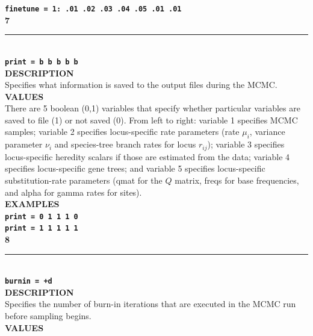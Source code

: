 \documentclass{book}
\numberwithin{equation}{section} \renewcommand{\baselinestretch}{0.55}
\begin{document}
\textbf{\texttt{finetune = 1: .01 .02 .03 .04 .05 .01 .01}}\vspace{10pt}\\
\textbf{{\large 7}} \\
\noindent\rule{\textwidth}{0.8pt} \\
\textbf{{\Large \texttt{print = b b b b b}}} \vspace{5pt}\\
\textbf{DESCRIPTION} \vspace{5pt}\\
Specifies what information is saved to the output files during the
MCMC.
\vspace{5pt}\\
\textbf{VALUES} \vspace{5pt}\\
There are 5 boolean (0,1) variables that specify whether particular
variables are saved to file (1) or not saved (0). From left to right:
variable 1 specifies MCMC samples; variable 2 specifies locus-specific
rate parameters (rate $\mu_i$, variance parameter $\nu_i$ and
species-tree branch rates for locus $r_{ij}$); variable 3 specifies
locus-specific heredity scalars if those are estimated from the data;
variable 4 specifies locus-specific gene trees; and variable 5
specifies locus-specific substitution-rate parameters (qmat for the
$Q$ matrix, freqs for base
frequencies, and alpha for gamma rates for sites).  \vspace{5pt}\\
\textbf{EXAMPLES} \vspace{5pt}\\
\textbf{\texttt{print = 0 1 1 1 0}} \vspace{5pt}\\
\textbf{\texttt{print = 1 1 1 1 1}} \vspace{10pt}\\
\textbf{{\large 8}} \\
\noindent\rule{\textwidth}{0.8pt} \\
\textbf{{\Large \texttt{burnin = +d}}} \vspace{5pt}\\
\textbf{DESCRIPTION} \vspace{5pt}\\
Specifies the number of burn-in iterations that are executed in the
MCMC run before sampling begins.
\vspace{5pt}\\
\textbf{VALUES} \vspace{5pt}\\
\end{document}
